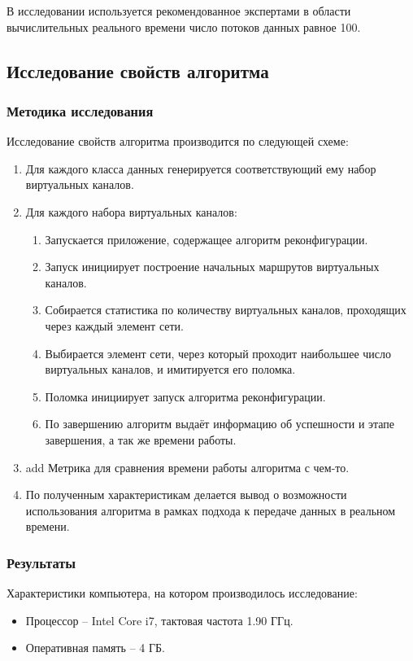 \documentclass[12pt,fleqn]{article}
\begin{document}
В исследовании используется рекомендованное экспертами в области вычислительных реального времени число потоков данных равное 100.

\subsection{Исследование свойств алгоритма}
\subsubsection{Методика исследования}
Исследование свойств алгоритма производится по следующей схеме:
\begin{enumerate}
	\item Для каждого класса данных генерируется соответствующий ему набор виртуальных каналов.
	\item Для каждого набора виртуальных каналов:
	\begin{enumerate}
		\item Запускается приложение, содержащее алгоритм реконфигурации.
		\item Запуск инициирует построение начальных маршрутов виртуальных каналов.
		\item Собирается статистика по количеству виртуальных каналов, проходящих через каждый элемент сети.
		\item Выбирается элемент сети, через который проходит наибольшее число виртуальных каналов, и имитируется его поломка.
		\item Поломка инициирует запуск алгоритма реконфигурации.
		\item По завершению алгоритм выдаёт информацию об успешности и этапе завершения, а так же времени работы.
	\end{enumerate}
	\item add Метрика для сравнения времени работы алгоритма с чем-то.
	\item По полученным характеристикам делается вывод о возможности использования алгоритма в рамках подхода к передаче данных в реальном времени.
\end{enumerate}
 
\subsubsection{Результаты}
Характеристики компьютера, на котором производилось исследование:
\begin{itemize}
	\item Процессор -- Intel Core i7, тактовая частота 1.90 ГГц.
	\item Оперативная память -- 4 ГБ.
\end{itemize}
\end{document}
